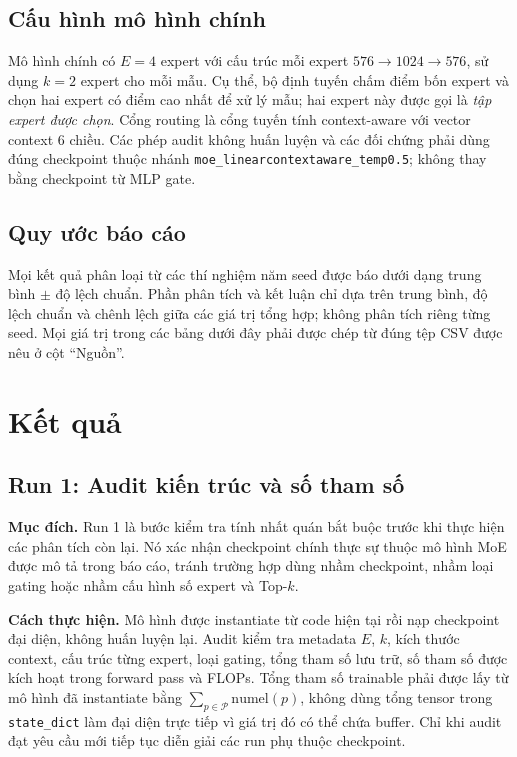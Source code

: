 \documentclass[conference]{IEEEtran}
\newcommand{\meanstd}{trung bình $\pm$ độ lệch chuẩn}
\begin{document}
\subsection{Cấu hình mô hình chính}

Mô hình chính có $E=4$ expert với cấu trúc mỗi expert
$576\rightarrow1024\rightarrow576$, sử dụng $k=2$ expert cho mỗi mẫu.
Cụ thể, bộ định tuyến chấm điểm bốn expert và chọn hai expert có điểm cao
nhất để xử lý mẫu; hai expert này được gọi là \emph{tập expert được chọn}.
Cổng routing là cổng tuyến tính context-aware với vector context 6 chiều.
Các phép audit không huấn luyện và các đối chứng phải dùng đúng checkpoint
thuộc nhánh \texttt{moe\_linearcontextaware\_temp0.5}; không thay bằng
checkpoint từ MLP gate.

\subsection{Quy ước báo cáo}

Mọi kết quả phân loại từ các thí nghiệm năm seed được báo dưới dạng
\meanstd{}. Phần phân tích và kết luận chỉ dựa trên trung bình, độ lệch chuẩn
và chênh lệch giữa các giá trị tổng hợp; không phân tích riêng từng seed.
Mọi giá trị trong các bảng dưới đây phải được chép từ đúng tệp CSV được nêu
ở cột ``Nguồn''.

\section{Kết quả}

\subsection{Run 1: Audit kiến trúc và số tham số}

\textbf{Mục đích.} Run 1 là bước kiểm tra tính nhất quán bắt buộc trước khi
thực hiện các phân tích còn lại. Nó xác nhận checkpoint chính thực sự thuộc
mô hình MoE được mô tả trong báo cáo, tránh trường hợp dùng nhầm checkpoint,
nhầm loại gating hoặc nhầm cấu hình số expert và Top-$k$.

\textbf{Cách thực hiện.} Mô hình được instantiate từ code hiện tại rồi nạp
checkpoint đại diện, không huấn luyện lại. Audit kiểm tra metadata
$E$, $k$, kích thước context, cấu trúc từng expert, loại gating, tổng tham số
lưu trữ, số tham số được kích hoạt trong forward pass và FLOPs. Tổng tham số
trainable phải được lấy từ mô hình đã instantiate bằng
$\sum_{p\in\mathcal{P}}\mathrm{numel}(p)$, không dùng tổng tensor trong
\texttt{state\_dict} làm đại diện trực tiếp vì giá trị đó có thể chứa buffer.
Chỉ khi audit đạt yêu cầu mới tiếp tục diễn giải các run phụ thuộc checkpoint.
\end{document}
